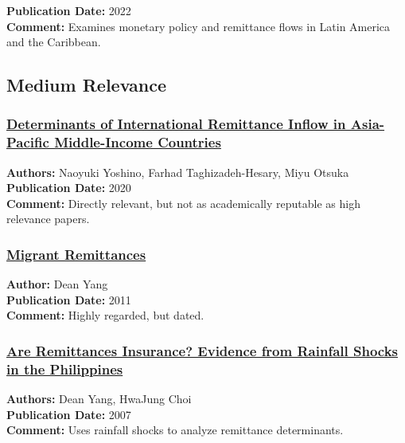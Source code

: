 \documentclass[
  11pt,
]{article}
\begin{document}
\textbf{Publication Date:} 2022\\
\textbf{Comment:} Examines monetary policy and remittance flows in Latin
America and the Caribbean.

\subsection{Medium Relevance}\label{medium-relevance}

\subsubsection{\texorpdfstring{\href{https://www.sciencedirect.com/science/article/pii/S0313592620304094}{Determinants
of International Remittance Inflow in Asia-Pacific Middle-Income
Countries}}{Determinants of International Remittance Inflow in Asia-Pacific Middle-Income Countries}}\label{determinants-of-international-remittance-inflow-in-asia-pacific-middle-income-countries}

\textbf{Authors:} Naoyuki Yoshino, Farhad Taghizadeh-Hesary, Miyu
Otsuka\\
\textbf{Publication Date:} 2020\\
\textbf{Comment:} Directly relevant, but not as academically reputable
as high relevance papers.

\subsubsection{\texorpdfstring{\href{https://drive.google.com/file/d/1e893ibGZcECt9gxIpPgq2XEE2kDGgqx-/view?usp=sharing}{Migrant
Remittances}}{Migrant Remittances}}\label{migrant-remittances}

\textbf{Author:} Dean Yang\\
\textbf{Publication Date:} 2011\\
\textbf{Comment:} Highly regarded, but dated.

\subsubsection{\texorpdfstring{\href{https://academic.oup.com/wber/article/21/2/219/1701529}{Are
Remittances Insurance? Evidence from Rainfall Shocks in the
Philippines}}{Are Remittances Insurance? Evidence from Rainfall Shocks in the Philippines}}\label{are-remittances-insurance-evidence-from-rainfall-shocks-in-the-philippines}

\textbf{Authors:} Dean Yang, HwaJung Choi\\
\textbf{Publication Date:} 2007\\
\textbf{Comment:} Uses rainfall shocks to analyze remittance
determinants.
\end{document}
